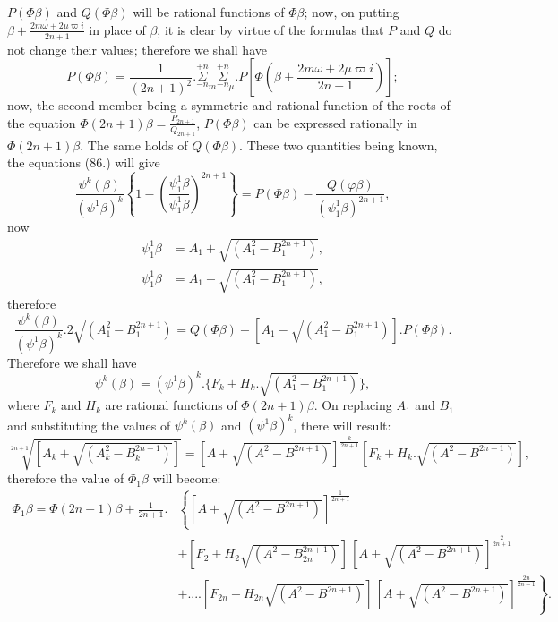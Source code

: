 \documentclass{article}
\begin{document}
$P(\Phi\beta)$ and $Q(\Phi\beta)$ will be rational functions of $\Phi\beta$; now, on putting $\beta+\frac{2m\omega+2\mu\varpi i}{2n+1}$ in place of $\beta$, it is clear by virtue of the formulas that $P$ and $Q$ do not change their values; therefore we shall have
\[ P(\Phi\beta)=\frac{1}{(2n+1)^{2}}.\overset{+n}{\underset{-n}{\Sigma}}_{m}\overset{+n}{\underset{-n}{\Sigma}}_{\mu}.P\left[\Phi\left(\beta+\frac{2m\omega+2\mu\varpi i}{2n+1}\right)\right]; \]
now, the second member being a symmetric and rational function of the roots of the equation $\Phi(2n+1)\beta=\frac{P_{2n+1}}{Q_{2n+1}}$, $P(\Phi\beta)$ can be expressed rationally in $\Phi(2n+1)\beta$. The same holds of $Q(\Phi\beta)$. These two quantities being known, the equations (86.) will give
\[ \frac{\psi^{k}(\beta)}{(\psi^{1}\beta)^{k}}\left\{1-\left(\frac{\psi_{1}^{1}\beta}{\psi_{1}^{1}\beta}\right)^{2n+1}\right\}=P(\Phi\beta)-\frac{Q(\varphi\beta)}{(\psi_{1}^{1}\beta)^{2n+1}}, \]
now
\[ \begin{aligned}
\psi_{1}^{1}\beta&=A_{1}+\sqrt{(A_{1}^{2}-B_{1}^{2n+1})},\\
\psi_{1}^{1}\beta&=A_{1}-\sqrt{(A_{1}^{2}-B_{1}^{2n+1})},
\end{aligned} \]
therefore
\[ \frac{\psi^{k}(\beta)}{(\psi^{1}\beta)^{k}}.2\sqrt{(A_{1}^{2}-B_{1}^{2n+1})}=Q(\Phi\beta)-[A_{1}-\sqrt{(A_{1}^{2}-B_{1}^{2n+1})}].P(\Phi\beta). \]
Therefore we shall have
\[ \psi^{k}(\beta)=(\psi^{1}\beta)^{k}.\{F_{k}+H_{k}.\sqrt{(A_{1}^{2}-B_{1}^{2n+1})}\}, \]
where $F_{k}$ and $H_{k}$ are rational functions of $\Phi(2n+1)\beta$. On replacing $A_{1}$ and $B_{1}$ and substituting the values of $\psi^{k}(\beta)$ and $(\psi^{1}\beta)^{k}$, there will result:
\[ \sqrt[2n+1]{[A_{k}+\sqrt{(A_{k}^{2}-B_{k}^{2n+1})}]}=[A+\sqrt{(A^{2}-B^{2n+1})}]^{\frac{k}{2n+1}}[F_{k}+H_{k}.\sqrt{(A^{2}-B^{2n+1})}], \]
therefore the value of $\Phi_{1}\beta$ will become:
\[ \begin{aligned}
\Phi_{1}\beta=\Phi(2n+1)\beta+\frac{1}{2n+1}.&\left\{[A+\sqrt{(A^{2}-B^{2n+1})}]^{\frac{1}{2n+1}}\right.\\
&+[F_{2}+H_{2}\sqrt{(A^{2}-B_{2n}^{2n+1})}]\,[A+\sqrt{(A^{2}-B^{2n+1})}]^{\frac{2}{2n+1}}\\
&\left.+....[F_{2n}+H_{2n}\sqrt{(A^{2}-B^{2n+1})}]\,[A+\sqrt{(A^{2}-B^{2n+1})}]^{\frac{2n}{2n+1}}\right\}.
\end{aligned} \tag{87.} \]
\end{document}
